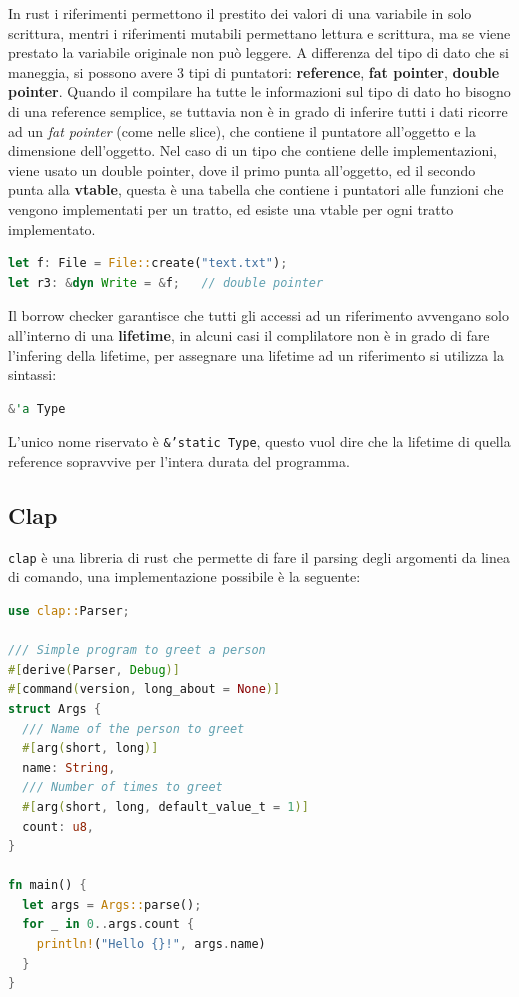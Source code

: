\documentclass[12pt]{article}
\begin{document}
In rust i riferimenti permettono il prestito dei valori di una variabile in solo scrittura, mentri i riferimenti mutabili permettano lettura e scrittura, ma se viene prestato la variabile originale non pu\`o leggere.
A differenza del tipo di dato che si maneggia, si possono avere 3 tipi di puntatori: \textbf{reference}, \textbf{fat pointer}, \textbf{double pointer}. Quando il compilare ha tutte le informazioni sul tipo di dato ho bisogno di una reference semplice, se tuttavia non \`e in grado di inferire tutti i dati ricorre ad un \emph{fat pointer} (come nelle slice), che contiene il puntatore all'oggetto e la dimensione dell'oggetto. Nel caso di un tipo che contiene delle implementazioni, viene usato un double pointer, dove il primo punta all'oggetto, ed il secondo punta alla \textbf{vtable}, questa \`e una tabella che contiene i puntatori alle funzioni che vengono implementati per un tratto, ed esiste una vtable per ogni tratto implementato.
\begin{lstlisting}[language=rust]
let f: File = File::create("text.txt");
let r3: &dyn Write = &f;   // double pointer
\end{lstlisting}
Il borrow checker garantisce che tutti gli accessi ad un riferimento avvengano solo all'interno di una \textbf{lifetime}, in alcuni casi il complilatore non \`e in grado di fare l'infering della lifetime, per assegnare una lifetime ad un riferimento si utilizza la sintassi:
\begin{lstlisting}[language=rust]
&'a Type
\end{lstlisting}
L'unico nome riservato \`e \texttt{\&'static Type}, questo vuol dire che la lifetime di quella reference sopravvive per l'intera durata del programma.


\subsection{Clap}
\texttt{clap} \`e una libreria di rust che permette di fare il parsing degli argomenti da linea di comando, una implementazione possibile \`e la seguente:
\begin{lstlisting}[language=rust]
use clap::Parser;

/// Simple program to greet a person
#[derive(Parser, Debug)]
#[command(version, long_about = None)]
struct Args {
  /// Name of the person to greet
  #[arg(short, long)]
  name: String,
  /// Number of times to greet
  #[arg(short, long, default_value_t = 1)]
  count: u8,
}

fn main() {
  let args = Args::parse();
  for _ in 0..args.count {
    println!("Hello {}!", args.name)
  }
}
\end{lstlisting}
\end{document}
